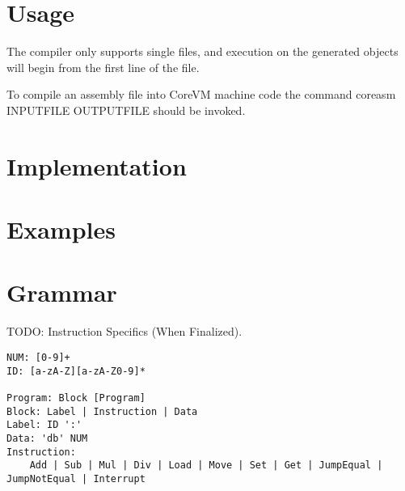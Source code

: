 \documentclass{article}
\begin{document}
\section* {Usage}

The compiler only supports single files, and execution on the generated objects will begin from the first line of the file.

To compile an assembly file into CoreVM machine code the command coreasm INPUTFILE OUTPUTFILE should be invoked.

\section* {Implementation}
\section* {Examples}
\section* {Grammar}

TODO: Instruction Specifics (When Finalized).

\begin{verbatim}
NUM: [0-9]+
ID: [a-zA-Z][a-zA-Z0-9]*

Program: Block [Program]
Block: Label | Instruction | Data
Label: ID ':'
Data: 'db' NUM
Instruction:
	Add | Sub | Mul | Div | Load | Move | Set | Get | JumpEqual | JumpNotEqual | Interrupt
\end{verbatim}
\end{document}
